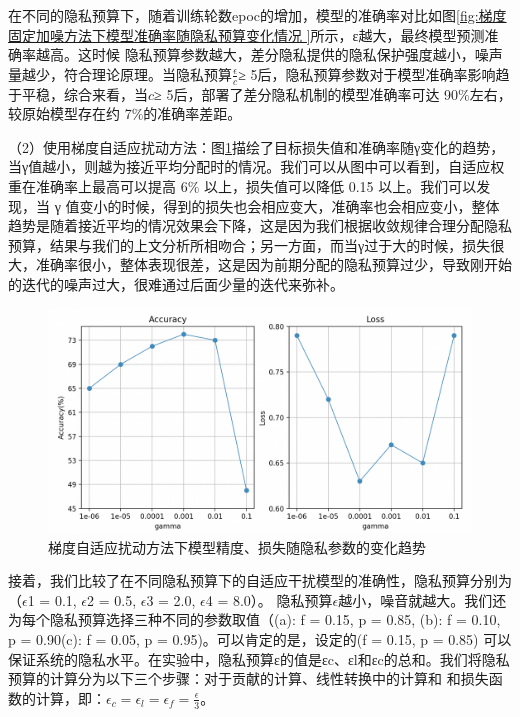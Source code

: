 在不同的隐私预算下，随着训练轮数epoc的增加，模型的准确率对比如图\ref{fig:梯度固定加噪方法下模型准确率随隐私预算变化情况 
}所示，ε越大，最终模型预测准确率越高。这时候
隐私预算参数越大，差分隐私提供的隐私保护强度越小，噪声量越少，符合理论原理。当隐私预算$\frac{\epsilon}{c}$≥ 5后，隐私预算参数对于模型准确率影响趋于平稳，综合来看，当$c$≥ 5后，部署了差分隐私机制的模型准确率可达 90$\%$左右，较原始模型存在约 7$\%$的准确率差距。

（2）使用梯度自适应扰动方法：图\ref{fig:梯度自适应扰动方法下模型精度、损失随隐私参数的变化趋势}描绘了目标损失值和准确率随γ变化的趋势，当γ值越小，则越为接近平均分配时的情况。我们可以从图中可以看到，自适应权重在准确率上最高可以提高 6$\%$ 以上，损失值可以降低 0.15 以上。我们可以发现，当 γ 值变小的时候，得到的损失也会相应变大，准确率也会相应变小，整体趋势是随着接近平均的情况效果会下降，这是因为我们根据收敛规律合理分配隐私预算，结果与我们的上文分析所相吻合；另一方面，而当γ过于大的时候，损失很大，准确率很小，整体表现很差，这是因为前期分配的隐私预算过少，导致刚开始的迭代的噪声过大，很难通过后面少量的迭代来弥补。

\begin{figure}[!hbt]
\centering
  	\includegraphics[scale=0.4]{fig2/C5/梯度自适应}%
	\caption{梯度自适应扰动方法下模型精度、损失随隐私参数的变化趋势}
  	\label{fig:梯度自适应扰动方法下模型精度、损失随隐私参数的变化趋势} 
\end{figure}

接着，我们比较了在不同隐私预算下的自适应干扰模型的准确性，隐私预算分别为（$\epsilon$1 = 0.1, $\epsilon$2 = 0.5, $\epsilon$3 = 2.0, $\epsilon$4 = 8.0）。
隐私预算$\epsilon$越小，噪音就越大。我们还为每个隐私预算选择三种不同的参数取值（(a): f = 0.15, p = 0.85, (b): f = 0.10, p = 0.90(c): f = 0.05, p = 0.95)。可以肯定的是，设定的(f = 0.15, p = 0.85) 可以保证系统的隐私水平。在实验中，隐私预算ε的值是εc、εl和εc的总和。我们将隐私预算的计算分为以下三个步骤：对于贡献的计算、线性转换中的计算和
和损失函数的计算，即：$\epsilon_{c}=\epsilon_{l}=\epsilon_{f}=\frac{\epsilon}{3}$。

